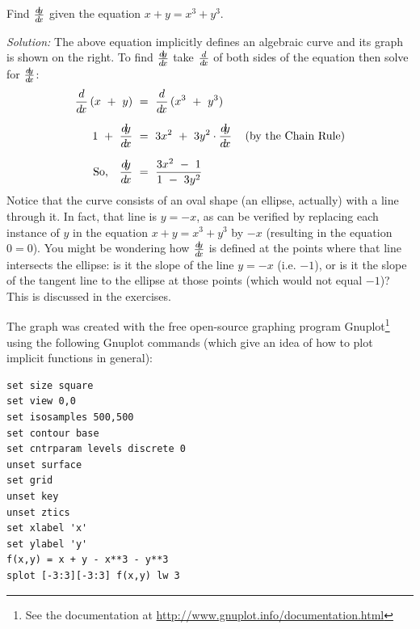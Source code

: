 \begin{exmp}\label{exmp:implicit2}
\parpic[r]{}
\noindent Find $\frac{d\negmedspace y}{d\!x}$ given the equation $x + y = x^3 + y^3$.\vspace{1mm}
\par\noindent\emph{Solution:} The above equation implicitly defines an
algebraic curve and its graph is shown on the right. To find
$\frac{d\negmedspace y}{d\!x}$ take $\frac{d}{d\!x}$ of both sides of the equation then solve for $\frac{d\negmedspace y}{d\!x}$:
\begin{align*}
\ddx\,(x ~+~ y) ~&=~ \ddx\,(x^3 ~+~ y^3)\\[6pt]
1 ~+~ \dydx ~&=~ 3x^2 ~+~ 3y^2 \cdot \dydx \quad\left(\text{by the Chain Rule}\right)\\[6pt]
\text{So,}\quad\dydx ~&=~ \frac{3x^2 ~-~ 1}{1 ~-~ 3y^2}
\end{align*}\vspace{-9mm}
Notice that the curve consists of an oval shape (an ellipse, actually) with a
line through it. In fact,
that line is $y = -x$, as can be verified by replacing each instance of $y$ in
the equation $x + y = x^3 + y^3$ by $-x$ (resulting in the equation $0=0$). You
might be wondering how $\frac{d\negmedspace y}{d\!x}$ is defined at the points where that line
intersects the ellipse: is it the slope of the line $y=-x$ (i.e. $-1$), or is it
the slope of the tangent line to the ellipse at those points (which would not
equal $-1$)? This is discussed in the exercises.

The graph was created with the free open-source graphing program
Gnuplot\footnote{See the documentation at
\url{http://www.gnuplot.info/documentation.html}} using the
following Gnuplot commands (which give an idea of how to plot implicit functions
in general):

\begin{Verbatim}[frame=single,framesep=3pt]
set size square
set view 0,0
set isosamples 500,500
set contour base
set cntrparam levels discrete 0
unset surface
set grid
unset key
unset ztics
set xlabel 'x'
set ylabel 'y'
f(x,y) = x + y - x**3 - y**3
splot [-3:3][-3:3] f(x,y) lw 3
\end{Verbatim}
\end{exmp}
\divider
\vspace{3mm}

